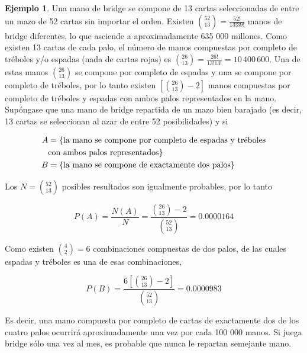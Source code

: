 \documentclass[
  11pt,
]{book}
\theoremstyle{definition}
\theoremstyle{definition}
\newtheorem{example}{Ejemplo}[chapter]
\theoremstyle{definition}
\theoremstyle{definition}
\theoremstyle{remark}
\begin{document}
\begin{example}
Una mano de bridge se compone de 13 cartas seleccionadas de entre un mazo de 52 cartas sin importar el orden. Existen \(\binom{52}{13} = \frac{52!}{13!39!}\) manos de bridge diferentes, lo que asciende a aproximadamente 635 000 millones. Como existen 13 cartas de cada palo, el número de manos compuestas por completo de tréboles y/o espadas (nada de cartas rojas) es \(\binom{26}{13} = \frac{26!}{13!13!} = 10\,400\,600\). Una de estas manos \(\binom{26}{13}\) se compone por completo de espadas y una se compone por completo de tréboles, por lo tanto existen \(\left[\binom{26}{13} - 2\right]\) manos compuestas por completo de tréboles y espadas con ambos palos representados en la mano. Supóngase que una mano de bridge repartida de un mazo bien barajado (es decir, 13 cartas se seleccionan al azar de entre 52 posibilidades) y si

\begin{equation}
\notag
\begin{split}
A &= \{\text{la mano se compone por completo de espadas y tréboles} \\
& \text{con ambos palos representados}\} \\
B &= \{\text{la mano se compone de exactamente dos palos}\}
\end{split}
\end{equation}

Los \(N = \binom{52}{13}\) posibles resultados son igualmente probables, por lo tanto

\[
P(A) = \frac{N(A)}{N} = \frac{\binom{26}{13} - 2}{\binom{52}{13}} = 0.0000164
\]

Como existen \(\binom{4}{2} = 6\) combinaciones compuestas de dos palos, de las cuales espadas y tréboles es una de esas combinaciones,

\[
P(B) = \frac{6\left[\binom{26}{13} - 2\right]}{\binom{52}{13}} = 0.0000983
\]

Es decir, una mano compuesta por completo de cartas de exactamente dos de los cuatro palos ocurrirá aproximadamente una vez por cada 100 000 manos. Si juega bridge sólo una vez al mes, es probable que nunca le repartan semejante mano.
\end{example}
\end{document}
